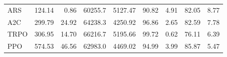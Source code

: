 \begin{samepage}
\begin{center}
\begin{tabular}{l|rr|rr|rr|rr}
    ARS          &   124.14 &     0.86 &    60255.7 &    5127.47 &   90.82 &    4.91 &   82.05 &    8.77 \\
    A2C          &   299.79 &    24.92 &    64238.3 &    4250.92 &   96.86 &    2.65 &   82.59 &    7.78 \\
    TRPO         &   306.95 &    14.70 &    66216.7 &    5195.66 &   99.72 &    0.62 &   76.11 &    6.39 \\
    PPO          &   574.53 &    46.56 &    62983.0 &    4469.02 &   94.99 &    3.99 &   85.87 &    5.47 \\
    \bottomrule
  \end{tabular}
\end{center}
\end{samepage}

